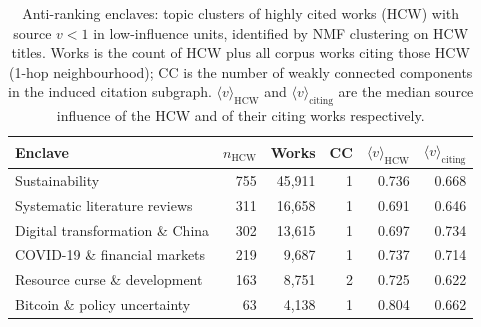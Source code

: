 \begin{table}[!htbp]
  \centering
  \caption{Anti-ranking enclaves: topic clusters of highly cited works (HCW) with source $v < 1$ in low-influence units, identified by NMF clustering on HCW titles. Works is the count of HCW plus all corpus works citing those HCW (1-hop neighbourhood); CC is the number of weakly connected components in the induced citation subgraph. $\langle v \rangle_{\text{HCW}}$ and $\langle v \rangle_{\text{citing}}$ are the median source influence of the HCW and of their citing works respectively.}
  \label{tab:enclaves}
  \small
  \begin{tabular}{lrrrrr}
    \toprule
    Enclave & $n_{\text{HCW}}$ & Works & CC & $\langle v \rangle_{\text{HCW}}$ & $\langle v \rangle_{\text{citing}}$ \\
    \midrule
    Sustainability & 755 & 45,911 & 1 & 0.736 & 0.668 \\
    Systematic literature reviews & 311 & 16,658 & 1 & 0.691 & 0.646 \\
    Digital transformation \& China & 302 & 13,615 & 1 & 0.697 & 0.734 \\
    COVID-19 \& financial markets & 219 & 9,687 & 1 & 0.737 & 0.714 \\
    Resource curse \& development & 163 & 8,751 & 2 & 0.725 & 0.622 \\
    Bitcoin \& policy uncertainty & 63 & 4,138 & 1 & 0.804 & 0.662 \\
    \bottomrule
  \end{tabular}
\end{table}
